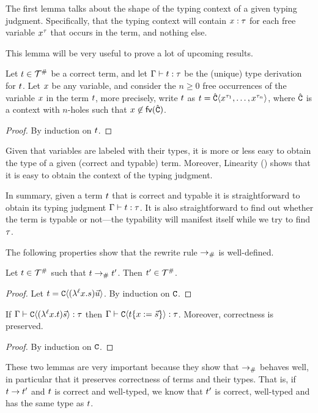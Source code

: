 
The first lemma talks about the shape of the typing context of a given typing judgment.
Specifically, that the typing context will contain $x : \tau$ for each free variable
$x^\tau$ that occurs in the term, and nothing else.

This lemma will be very useful to prove a lot of upcoming results.

\begin{lemma}[Linearity]
Let $t \in \mathcal{T}^{\mathtt{\#}}$ be a correct term,
and let $\Gamma \vdash t : \tau$ be the (unique) type derivation for $t$.
Let $x$ be any variable,
and consider the $n \geq 0$ free occurrences of the variable $x$ in the term $t$,
more precisely, write $t$ as $t = \hat{\mathtt{C}}\langle x^{\tau_1},\hdots,x^{\tau_n}\rangle$,
where $\hat{\mathtt{C}}$ is a context with $n$-holes such that $x \not\in \mathsf{fv}({\hat{\mathtt{C}}})$.
\end{lemma}
\begin{proof}
By induction on $t$.
\end{proof}


\begin{remark}
  Given that variables are labeled with their types, it is more or less easy to obtain
  the type of a given (correct and typable) term.
  Moreover, Linearity () shows that it is easy to obtain the context of the typing judgment.

  In summary, given a term $t$ that is correct and typable
  it is straightforward to obtain its typing judgment
  $\Gamma \vdash t : \tau$.
  It is also straightforward to find out whether the term is typable or not---the
  typability will manifest itself while we try to find $\tau$.
\end{remark}



The following properties show that the rewrite rule $\mathrel{\to_{\mathtt{\#}}}$ is well-defined.

\begin{lemma}
Let $t \in \mathcal{T}^{\mathtt{\#}}$ such that $t \mathrel{\to_{\mathtt{\#}}} t'$. Then $t' \in \mathcal{T}^{\mathtt{\#}}$.
\end{lemma}
\begin{proof}
Let $t = \mathtt{C}\langle(\lambda^{\ell} x. s) \vec{u}\rangle$. By induction on $\mathtt{C}$.
\end{proof}


\begin{lemma}
If $\Gamma \vdash \mathtt{C}\langle(\lambda^{\ell} x. t) \vec{s}\rangle : \tau$
then $\Gamma \vdash \mathtt{C}\langle t\{x := \vec{s}\}\rangle : \tau$.
Moreover, correctness is preserved.
\end{lemma}
\begin{proof}
 By induction on $\mathtt{C}$.
\end{proof}

These two lemmas are very important because they show that $\mathrel{\to_{\mathtt{\#}}}$ behaves
well, in particular that it preserves correctness of terms and their types.
That is, if $t \to t'$ and $t$ is correct and well-typed,
we know that $t'$ is correct, well-typed and has the same type as $t$.
